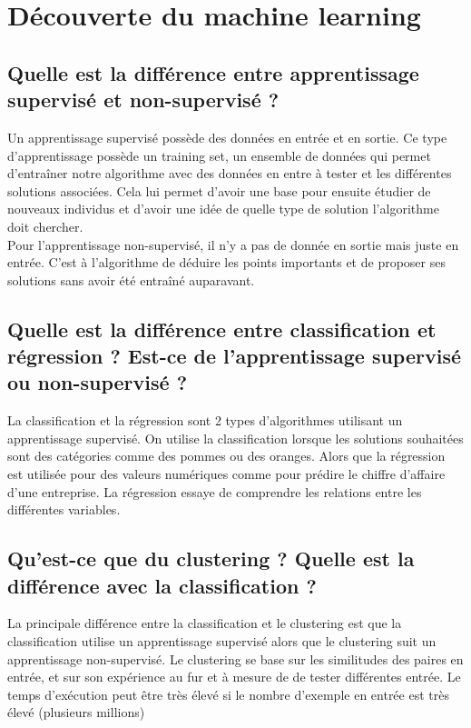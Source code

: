 \chapter{Découverte du machine learning}
\section{Quelle est la différence entre apprentissage supervisé et non-supervisé ?}
Un apprentissage supervisé possède des données en entrée et en sortie. Ce type d’apprentissage possède un training set, un ensemble de données qui permet d’entraîner notre algorithme avec des données en entre à tester et les différentes solutions associées. Cela lui permet d’avoir une base pour ensuite étudier de nouveaux individus et d’avoir une idée de quelle type de solution l’algorithme doit chercher.\\

Pour l’apprentissage non-supervisé, il n’y a pas de donnée en sortie mais juste en entrée. C’est à l’algorithme de déduire les points importants et de proposer ses solutions sans avoir été entraîné auparavant.

\section{Quelle est la différence entre classification et régression ? Est-ce de l’apprentissage supervisé ou non-supervisé ?}
La classification et la régression sont 2 types d’algorithmes utilisant un apprentissage supervisé. On utilise la classification lorsque les solutions souhaitées sont des catégories comme des pommes ou des oranges. Alors que la régression est utilisée pour des valeurs numériques comme pour prédire le chiffre d’affaire d’une entreprise. La régression essaye de comprendre les relations entre les différentes variables.


\section{Qu’est-ce que du clustering ? Quelle est la différence avec la classification ?}
La principale différence entre la classification et le clustering est que la classification utilise un apprentissage supervisé alors que le clustering suit un apprentissage non-supervisé. Le clustering se base sur les similitudes des paires en entrée, et sur son expérience au fur et à mesure de de tester différentes entrée. Le temps d’exécution peut être très élevé si le nombre d’exemple en entrée est très élevé (plusieurs millions)

